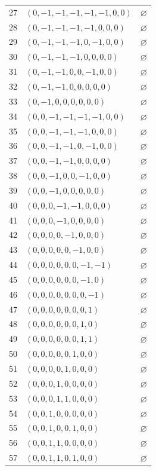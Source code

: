 \begin{longtable}{@{}rll@{}}
27 & $(0,-1,-1,-1,-1,-1,0,0)$ & $\varnothing$\\
28 & $(0,-1,-1,-1,-1,0,0,0)$ & $\varnothing$\\
29 & $(0,-1,-1,-1,0,-1,0,0)$ & $\varnothing$\\
30 & $(0,-1,-1,-1,0,0,0,0)$ & $\varnothing$\\
31 & $(0,-1,-1,0,0,-1,0,0)$ & $\varnothing$\\
32 & $(0,-1,-1,0,0,0,0,0)$ & $\varnothing$\\
33 & $(0,-1,0,0,0,0,0,0)$ & $\varnothing$\\
34 & $(0,0,-1,-1,-1,-1,0,0)$ & $\varnothing$\\
35 & $(0,0,-1,-1,-1,0,0,0)$ & $\varnothing$\\
36 & $(0,0,-1,-1,0,-1,0,0)$ & $\varnothing$\\
37 & $(0,0,-1,-1,0,0,0,0)$ & $\varnothing$\\
38 & $(0,0,-1,0,0,-1,0,0)$ & $\varnothing$\\
39 & $(0,0,-1,0,0,0,0,0)$ & $\varnothing$\\
40 & $(0,0,0,-1,-1,0,0,0)$ & $\varnothing$\\
41 & $(0,0,0,-1,0,0,0,0)$ & $\varnothing$\\
42 & $(0,0,0,0,-1,0,0,0)$ & $\varnothing$\\
43 & $(0,0,0,0,0,-1,0,0)$ & $\varnothing$\\
44 & $(0,0,0,0,0,0,-1,-1)$ & $\varnothing$\\
45 & $(0,0,0,0,0,0,-1,0)$ & $\varnothing$\\
46 & $(0,0,0,0,0,0,0,-1)$ & $\varnothing$\\
47 & $(0,0,0,0,0,0,0,1)$ & $\varnothing$\\
48 & $(0,0,0,0,0,0,1,0)$ & $\varnothing$\\
49 & $(0,0,0,0,0,0,1,1)$ & $\varnothing$\\
50 & $(0,0,0,0,0,1,0,0)$ & $\varnothing$\\
51 & $(0,0,0,0,1,0,0,0)$ & $\varnothing$\\
52 & $(0,0,0,1,0,0,0,0)$ & $\varnothing$\\
53 & $(0,0,0,1,1,0,0,0)$ & $\varnothing$\\
54 & $(0,0,1,0,0,0,0,0)$ & $\varnothing$\\
55 & $(0,0,1,0,0,1,0,0)$ & $\varnothing$\\
56 & $(0,0,1,1,0,0,0,0)$ & $\varnothing$\\
57 & $(0,0,1,1,0,1,0,0)$ & $\varnothing$\\

\end{longtable}
